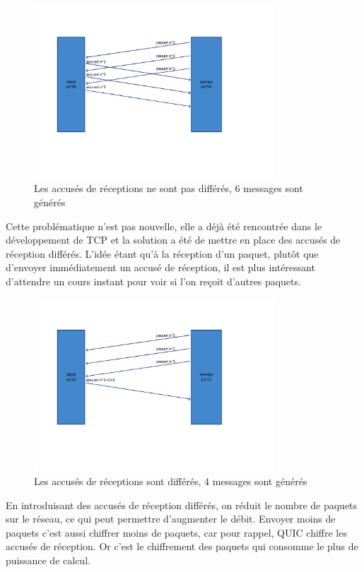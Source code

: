 \begin{figure}[H]
    \centering
    \includegraphics[width=0.8\textwidth]{figures/ack_not_delayed.png}
    \caption{Les accusés de réceptions ne sont pas différés, 6 messages sont générés}
\end{figure}

Cette problématique n'est pas nouvelle, elle a déjà été rencontrée dans le développement de TCP et la solution a été de mettre en place des accusés de réception différés. L'idée étant qu'à la réception d'un paquet, plutôt que d'envoyer immédiatement un accusé de réception, il est plus intéressant d'attendre un cours instant pour voir si l'on reçoit d'autres paquets.

\begin{figure}[H]
    \centering
    \includegraphics[width=0.8\textwidth]{figures/ack_delayed.png}
    \caption{Les accusés de réceptions sont différés, 4 messages sont générés}
\end{figure}

En introduisant des accusés de réception différés, on réduit le nombre de paquets sur le réseau, ce qui peut permettre d'augmenter le débit. Envoyer moins de paquets c'est aussi chiffrer moins de paquets, car pour rappel, QUIC chiffre les accusés de réception. Or c'est le chiffrement des paquets qui consomme le plus de puissance de calcul.

